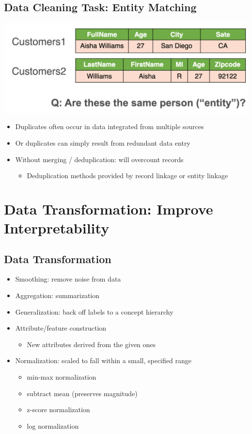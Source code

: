 \documentclass[11pt]{article}
\theoremstyle{definition}
\begin{document}
\subsection{Data Cleaning Task: Entity Matching}
\includegraphics[width=\textwidth]{17.png}
\begin{itemize}
    \item Duplicates often occur in data integrated from multiple sources
    \item Or duplicates can simply result from redundant data entry
    \item Without merging / deduplication: will overcount records
    \begin{itemize}
        \item Deduplication methods provided by record linkage or entity linkage
    \end{itemize}
\end{itemize}
\newpage
\section{Data Transformation:
Improve Interpretability}
\subsection{Data Transformation}
\begin{itemize}
    \item Smoothing: remove noise from data
    \item Aggregation: summarization
    \item Generalization: back off labels to a concept hierarchy
    \item Attribute/feature construction
    \begin{itemize}
        \item New attributes derived from the given ones
    \end{itemize}
    \item Normalization: scaled to fall within a small, specified range
    \begin{itemize}
        \item min-max normalization
        \item subtract mean (preserves magnitude)
        \item z-score normalization
        \item log normalization
    \end{itemize}
\end{itemize}
\end{document}
